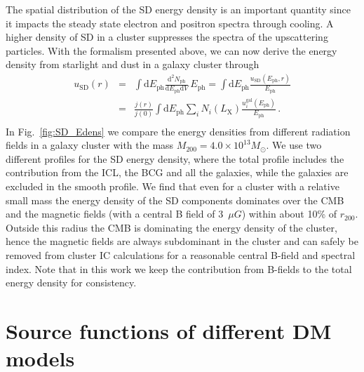 \documentclass[10pt,aps,pra,reprint,amsmath,amsfonts,amssymb,showpacs]{revtex4-1}
\newcommand{\rmn}{\mathrm}
\newcommand{\ph}{\rmn{ph}}
\newcommand{\eph}{E_\ph}
\newcommand{\gal}{\rmn{gal}}
\newcommand{\sd}{\rmn{SD}}
\newcommand{\msun}{M_\odot}
\newcommand{\lx}{L_\rmn{X}}
\newcommand{\dd}{\rmn{d}}
\newcommand{\rvir}{r_{200}}
\newcommand{\mvir}{M_{200}}
\begin{document}
The spatial distribution of the SD energy density is an important quantity since
it impacts the steady state electron and positron spectra through cooling. A
higher density of SD in a cluster suppresses the spectra of the upscattering
particles. With the formalism presented above, we can now derive the energy
density from starlight and dust in a galaxy cluster through
\begin{eqnarray}
\label{eq:U_SD}
u_\sd(r) &=& \int \dd \eph \frac{\dd^2 N_\ph}{\dd \eph \dd V}\,\eph
=\int \dd \eph \frac{u_\sd(\eph, r)}{\eph}
\nonumber \\
&=&  \frac{j(r)}{j(0)}  \int \dd \eph \sum_i 
N_i(\lx) \frac{u_i^\gal(\eph)}{\eph}\,. \nonumber \\
\end{eqnarray}
In Fig.~\ref{fig:SD_Edens} we compare the energy densities from
different radiation fields in a galaxy cluster with the mass
$\mvir=4.0\times10^{13}\msun$. We use two different profiles for the
SD energy density, where the total profile includes the contribution
from the ICL, the BCG and all the galaxies, while the galaxies are
excluded in the smooth profile. We find that even for a cluster with a
relative small mass the energy density of the SD components dominates
over the CMB and the magnetic fields (with a central B field of 3~$\mu
G$) within about 10\% of $\rvir$. Outside this radius the CMB is
dominating the energy density of the cluster, hence the magnetic
fields are always subdominant in the cluster and can safely be removed
from cluster IC calculations for a reasonable central B-field and
spectral index. Note that in this work we keep the contribution
from B-fields to the total energy density for consistency.



\section{Source functions of different DM models}
\end{document}
